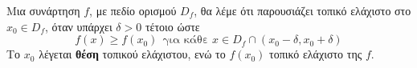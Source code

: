Μια συνάρτηση $ f $, με πεδίο ορισμού $ D_f $, θα λέμε ότι παρουσιάζει τοπικό ελάχιστο στο $ x_0\in D_f $, όταν υπάρχει $ \delta>0 $ τέτοιο ώστε
\[ f(x)\geq f(x_0)\ \ \textrm{για κάθε }x\in D_f\cap(x_0-\delta,x_0+\delta) \]
Το $ x_0 $ λέγεται \textbf{θέση} τοπικού ελάχιστου, ενώ το $ f(x_0) $ τοπικό ελάχιστο της $ f $.

